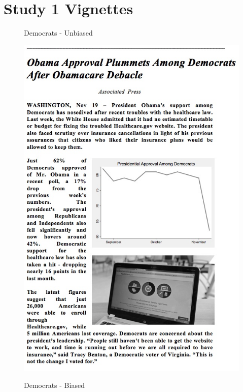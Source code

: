 \documentclass[12pt, letterpaper]{article}
\begin{document}
\section{Study 1 Vignettes}
\label{mturk_treats}

\begin{figure}[ht]
\centering
\begin{minipage}[b][12cm][b]{0.45\linewidth}
\caption{Democrats - Unbiased}
\includegraphics[width=1.05\textwidth]{../figs/mturk_1_treats/Dem_C.jpg}
\label{fig:minipage1}
\end{minipage}
\quad
\begin{minipage}[b]{0.45\linewidth}
\caption{Democrats - Biased}

\end{minipage}
\end{figure}
\end{document}
